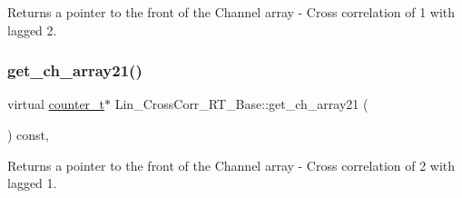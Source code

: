 Returns a pointer to the front of the Channel array -\/ Cross correlation of 1 with lagged 2. \mbox{\label{group__Lin__CorrCorr__Base__Out_ga9f075c765376a156da279b23bc18c07f}} 
\subsubsection{\texorpdfstring{get\+\_\+ch\+\_\+array21()}{get\_ch\_array21()}}
{\footnotesize\ttfamily virtual \hyperlink{types_8hpp_a22f279793847eba127de149437848c48}{counter\+\_\+t}$\ast$ Lin\+\_\+\+Cross\+Corr\+\_\+\+R\+T\+\_\+\+Base\+::get\+\_\+ch\+\_\+array21 (\begin{DoxyParamCaption}{ }\end{DoxyParamCaption}) const\hspace{0.3cm}{\ttfamily [inline]}, {}}

Returns a pointer to the front of the Channel array -\/ Cross correlation of 2 with lagged 1. 